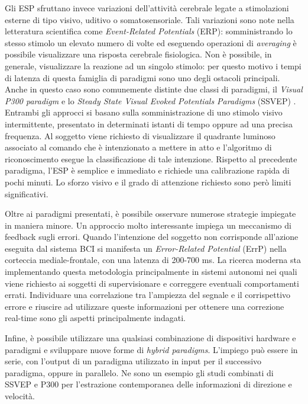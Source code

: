 Gli ESP sfruttano invece variazioni dell’attività cerebrale legate a stimolazioni esterne di tipo visivo, uditivo o somatosensoriale. Tali variazioni sono note nella letteratura scientifica come \emph{Event-Related Potentials} (ERP): somministrando lo stesso stimolo un elevato numero di volte ed eseguendo operazioni di \emph{averaging} è possibile visualizzare una risposta cerebrale fisiologica. Non è possibile, in generale, visualizzare la reazione ad un singolo stimolo: per questo motivo i tempi di latenza di questa famiglia di paradigmi sono uno degli ostacoli principali. Anche in questo caso sono comunemente distinte due classi di paradigmi, il \emph{Visual P300 paradigm} e lo \emph{Steady State Visual Evoked Potentials Paradigms} (SSVEP) \cite{maslova2023noninvasive}. Entrambi gli approcci si basano sulla somministrazione di uno stimolo visivo intermittente, presentato in determinati istanti di tempo oppure ad una precisa frequenza. Al soggetto viene richiesto di visualizzare il quadrante luminoso associato al comando che è intenzionato a mettere in atto e l’algoritmo di riconoscimento esegue la classificazione di tale intenzione. Rispetto al precedente paradigma, l’ESP è semplice e immediato e richiede una calibrazione rapida di pochi minuti. Lo sforzo visivo e il grado di attenzione richiesto sono però limiti significativi.

Oltre ai paradigmi presentati, è possibile osservare numerose strategie impiegate in maniera minore. Un approccio molto interessante impiega un meccanismo di feedback sugli errori. Quando l’intenzione del soggetto non corrisponde all’azione eseguita dal sistema BCI si manifesta un \emph{Error-Related Potential} (ErrP) nella corteccia mediale-frontale, con una latenza di 200-700 ms. La ricerca moderna sta implementando questa metodologia principalmente in sistemi autonomi nei quali viene richiesto ai soggetti di supervisionare e correggere eventuali comportamenti errati. Individuare una correlazione tra l’ampiezza del segnale e il corrispettivo errore e riuscire ad utilizzare queste informazioni per ottenere una correzione real-time sono gli aspetti principalmente indagati.

Infine, è possibile utilizzare una qualsiasi combinazione di dispositivi hardware e paradigmi e sviluppare nuove forme di \emph{hybrid paradigms}. L’impiego può essere in serie, con l’output di un paradigma utilizzato in input per il successivo paradigma, oppure in parallelo. Ne sono un esempio gli studi combinati di SSVEP e P300 per l’estrazione contemporanea delle informazioni di direzione e velocità.

